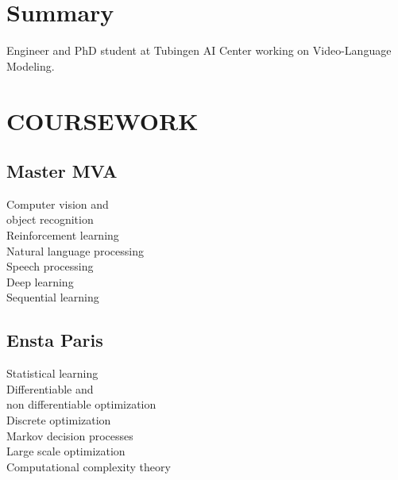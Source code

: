 \documentclass[]{deedy-resume-openfont}
\begin{document}
%
%

%
%

%
%

\begin{minipage}[t]{0.33\textwidth} 
\sectionsep
\sectionsep
\section{Summary}
Engineer and PhD student at Tubingen AI Center working on Video-Language Modeling. 
\sectionsep



\sectionsep

\section{COURSEWORK} 

\sectionsep

\subsection{Master MVA}
\textbullet{} Computer vision and \\object recognition\\ 
\textbullet{} Reinforcement learning \\
\textbullet{} Natural language processing \\
\textbullet{} Speech processing \\
\textbullet{} Deep learning \\
\textbullet{} Sequential learning\\


\subsection{Ensta Paris}
\textbullet{} Statistical learning \\
\textbullet{} Differentiable and \\non differentiable optimization \\
\textbullet{} Discrete optimization \\
\textbullet{} Markov decision processes \\ 
\textbullet{} Large scale optimization \\
\textbullet{} Computational complexity theory \\


\end{minipage}
\end{document}
